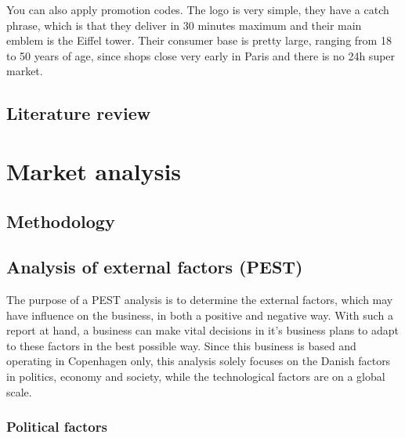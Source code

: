 \documentclass[12p]{article}
\begin{document}
You can also apply promotion codes.
The logo is very  simple, they have a catch phrase, which is that they deliver in 30 minutes maximum and their main emblem is the Eiffel tower.
Their consumer base is pretty large, ranging from 18 to 50 years of age, since shops close very early in Paris and there is no 24h super market.


\subsection{Literature review}


\newpage
\section{Market analysis} \label{MarketAnalysis}


\subsection{Methodology} \label{Methodology}

\newpage


\subsection{Analysis of external factors (PEST)} \label{PEST}

The purpose of a PEST analysis is to determine the external factors, which may have influence on the business, in both a positive and negative way. With such a report at hand, a business can make vital decisions in it's business plans to adapt to these factors in the best possible way. Since this business is based and operating in Copenhagen only, this analysis solely focuses on the Danish factors in politics, economy and society, while the technological factors are on a global scale.

\subsubsection{Political factors}
\end{document}
